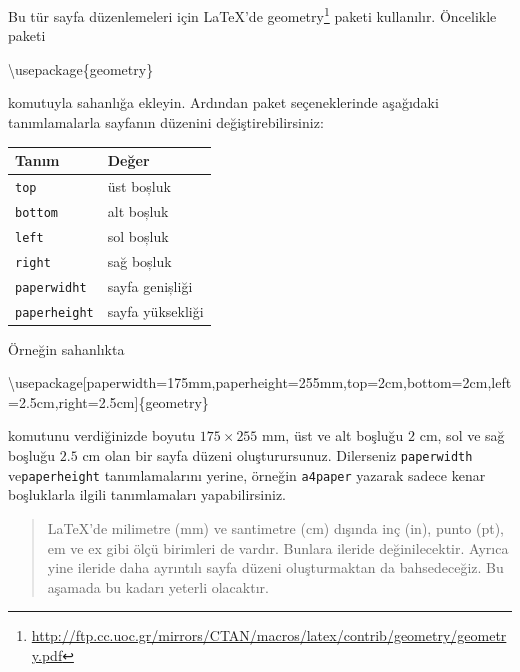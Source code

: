 \documentclass[
  10pt,
]{scrbook}
\newenvironment{Shaded}{\begin{snugshade}}{\end{snugshade}}
\newcommand{\FloatTok}[1]{\textcolor[rgb]{0.00,0.00,0.81}{#1}}
\newcommand{\NormalTok}[1]{#1}
\newcommand{\OtherTok}[1]{\textcolor[rgb]{0.56,0.35,0.01}{#1}}
\renewcommand{\href}[2]{#2\footnote{\url{#1}}}
\begin{document}
Bu tür sayfa düzenlemeleri için LaTeX'de
\href{http://ftp.cc.uoc.gr/mirrors/CTAN/macros/latex/contrib/geometry/geometry.pdf}{geometry} paketi kullanılır. Öncelikle paketi

\begin{Shaded}
\begin{Highlighting}[]
\NormalTok{\textbackslash{}usepackage\{geometry\}}
\end{Highlighting}
\end{Shaded}

komutuyla sahanlığa ekleyin. Ardından paket seçeneklerinde aşağıdaki
tanımlamalarla sayfanın düzenini değiştirebilirsiniz:

\begin{longtable}[]{@{}ll@{}}
\toprule
Tanım & Değer \\
\midrule
\endhead
\texttt{top} & üst boșluk \\
\texttt{bottom} & alt boșluk \\
\texttt{left} & sol boșluk \\
\texttt{right} & sağ boșluk \\
\texttt{paperwidht} & sayfa genișliği \\
\texttt{paperheight} & sayfa yüksekliği \\
\bottomrule
\end{longtable}

Örneğin sahanlıkta

\begin{Shaded}
\begin{Highlighting}[]
\NormalTok{\textbackslash{}usepackage[paperwidth}\OtherTok{=}\NormalTok{175mm,paperheight}\OtherTok{=}\NormalTok{255mm,top}\OtherTok{=}\NormalTok{2cm,bottom}\OtherTok{=}\NormalTok{2cm,left}\OtherTok{=}\FloatTok{2.5}\NormalTok{cm,right}\OtherTok{=}\FloatTok{2.5}\NormalTok{cm]\{geometry\}}
\end{Highlighting}
\end{Shaded}

komutunu verdiğinizde boyutu \(175\times 255\) mm, üst ve alt boşluğu
\(2\) cm, sol ve sağ boşluğu \(2.5\) cm olan bir sayfa düzeni
oluşturursunuz. Dilerseniz \texttt{paperwidth} ve\texttt{paperheight} tanımlamalarını
yerine, örneğin \texttt{a4paper} yazarak sadece kenar boşluklarla ilgili
tanımlamaları yapabilirsiniz.

\begin{quote}
LaTeX'de milimetre (mm) ve santimetre (cm) dışında inç (in), punto
(pt), em ve ex gibi ölçü birimleri de vardır. Bunlara ileride
değinilecektir. Ayrıca yine ileride daha ayrıntılı sayfa düzeni
oluşturmaktan da bahsedeceğiz. Bu aşamada bu kadarı yeterli olacaktır.
\end{quote}
\end{document}
